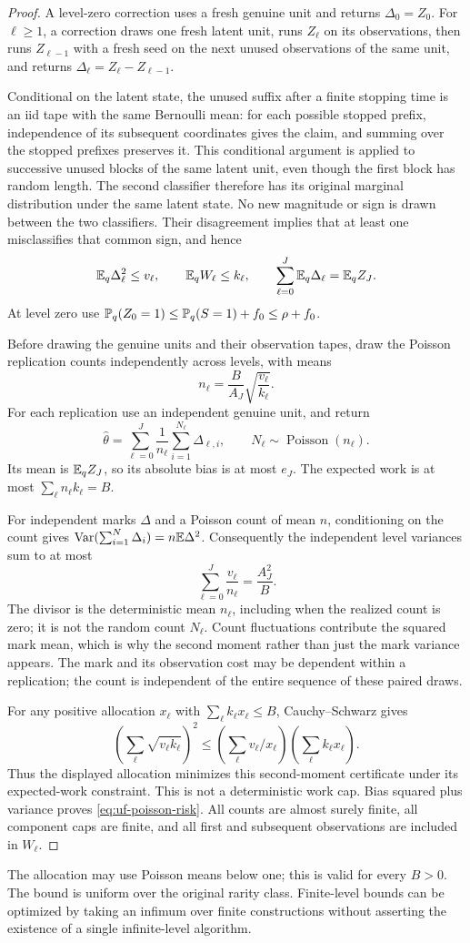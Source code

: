 \begin{proof}
A level-zero correction uses a fresh genuine unit and returns
$\Delta_0=Z_0$. For $\ell\ge1$, a correction draws one fresh latent unit,
runs $Z_\ell$ on its observations, then runs $Z_{\ell-1}$ with a fresh
seed on the next unused observations of the same unit, and returns
$\Delta_\ell=Z_\ell-Z_{\ell-1}$.

Conditional on the latent state, the unused suffix after a finite
stopping time is an iid tape with the same Bernoulli mean: for each
possible stopped prefix, independence of its subsequent coordinates
gives the claim, and summing over the stopped prefixes preserves it.
This conditional argument is applied to successive unused blocks of
the same latent unit, even though the first block has random length.
The second classifier therefore has its original marginal distribution
under the same latent state. No new magnitude or sign is drawn between
the two classifiers. Their disagreement implies that at least one
misclassifies that common sign, and hence
\[
 \mathbb E_q\Delta_\ell^2\le v_\ell,\qquad
 \mathbb E_q W_\ell\le k_\ell,\qquad
 \sum_{\ell=0}^J\mathbb E_q\Delta_\ell=\mathbb E_qZ_J.
\]
At level zero use
$\mathbb P_q(Z_0=1)\le\mathbb P_q(S=1)+f_0\le\rho+f_0$.

Before drawing the genuine units and their observation tapes, draw
the Poisson replication counts independently across levels, with means
\[
 n_\ell=\frac B{A_J}\sqrt{\frac{v_\ell}{k_\ell}}.
\]
For each replication use an independent genuine unit, and return
\[
 \widehat\theta
 =\sum_{\ell=0}^J\frac1{n_\ell}
       \sum_{i=1}^{N_\ell}\Delta_{\ell,i},
 \qquad N_\ell\sim\operatorname{Poisson}(n_\ell).
\]
Its mean is $\mathbb E_qZ_J$, so its absolute bias is at most $e_J$.
The expected work is at most
$\sum_\ell n_\ell k_\ell=B$.

For independent marks $\Delta$ and a Poisson count of mean $n$,
conditioning on the count gives
$\operatorname{Var}(\sum_{i=1}^{N}\Delta_i)=n\mathbb E\Delta^2$.
Consequently the independent level variances sum to at most
\[
 \sum_{\ell=0}^J\frac{v_\ell}{n_\ell}=\frac{A_J^2}{B}.
\]
The divisor is the deterministic mean $n_\ell$, including when the
realized count is zero; it is not the random count $N_\ell$. Count
fluctuations contribute the squared mark mean, which is why the second
moment rather than just the mark variance appears. The mark and its
observation cost may be dependent within a replication; the count is
independent of the entire sequence of these paired draws.

For any positive allocation $x_\ell$ with $\sum_\ell k_\ell x_\ell\le B$,
Cauchy--Schwarz gives
\[
 \left(\sum_\ell\sqrt{v_\ell k_\ell}\right)^2
 \le\left(\sum_\ell v_\ell/x_\ell\right)
       \left(\sum_\ell k_\ell x_\ell\right).
\]
Thus the displayed allocation minimizes this second-moment certificate
under its expected-work constraint. This is not a deterministic work cap.
Bias squared plus variance proves \eqref{eq:uf-poisson-risk}.
All counts are almost surely finite, all component caps are finite,
and all first and subsequent observations are included in $W_\ell$.
\end{proof}

The allocation may use Poisson means below one; this is valid for
every $B>0$. The bound is uniform over the original rarity class.
Finite-level bounds can be optimized by taking an infimum over
finite constructions without asserting the existence of a single
infinite-level algorithm.
